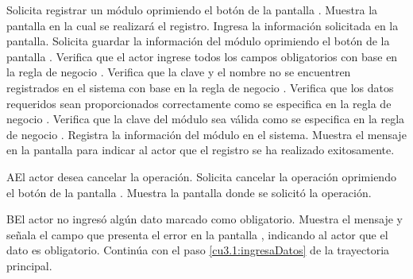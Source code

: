  \begin{UCtrayectoria}
    \UCpaso[\UCactor] Solicita registrar un módulo oprimiendo el botón  de la pantalla .
    \UCpaso[\UCsist] Muestra la pantalla  en la cual se realizará el registro. 
    \UCpaso[\UCactor] Ingresa la información solicitada en la pantalla. \label{cu3.1:ingresaDatos}
    \UCpaso[\UCactor] Solicita guardar la información del módulo oprimiendo el botón  de la pantalla .  
    \UCpaso[\UCsist] Verifica que el actor ingrese todos los campos obligatorios con base en la regla de negocio . 
    \UCpaso[\UCsist] Verifica que la clave y el nombre no se encuentren registrados en el sistema con base en la regla de negocio  . 
    \UCpaso[\UCsist] Verifica que los datos requeridos sean proporcionados correctamente como se especifica en la regla de negocio .  
    \UCpaso[\UCsist] Verifica que la clave del módulo sea válida como se especifica en la regla de negocio . 
    \UCpaso[\UCsist] Registra la información del módulo en el sistema.
    \UCpaso[\UCsist] Muestra el mensaje  en la pantalla 
    para indicar al actor que el registro se ha realizado exitosamente.
 \end{UCtrayectoria}
 \begin{UCtrayectoriaA}{A}{El actor desea cancelar la operación.}
    \UCpaso[\UCactor] Solicita cancelar la operación oprimiendo el botón  de la pantalla .
    \UCpaso[\UCsist] Muestra la pantalla donde se solicitó la operación.
 \end{UCtrayectoriaA} 
 \begin{UCtrayectoriaA}{B}{El actor no ingresó algún dato marcado como obligatorio.}
    \UCpaso[\UCsist] Muestra el mensaje  y señala el campo que presenta el error en la pantalla 
	    , indicando al actor que el dato es obligatorio.
    \UCpaso[] Continúa con el paso \ref{cu3.1:ingresaDatos} de la trayectoria principal.
 \end{UCtrayectoriaA}
